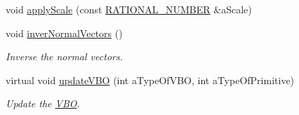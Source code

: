 \begin{DoxyCompactItemize}
void \hyperlink{class_graphics_1_1_triangle_mesh_a939fff82574df1f0150e3f0ddff0757e}{applyScale} (const \hyperlink{namespace_utilities_a40969b96bd8d847b962e297cb79f08ce}{RATIONAL\_\-NUMBER} \&aScale)
\item 
void \hyperlink{class_graphics_1_1_triangle_mesh_a1e104006a495fbabd7c6c8abb38ec3b3}{inverNormalVectors} ()
\begin{DoxyCompactList}\small\item\em Inverse the normal vectors. \end{DoxyCompactList}\item 
virtual void \hyperlink{class_graphics_1_1_triangle_mesh_a94cb51475ab61e9c572eefb2d4cf1de6}{updateVBO} (int aTypeOfVBO, int aTypeOfPrimitive)
\begin{DoxyCompactList}\small\item\em Update the \hyperlink{class_graphics_1_1_v_b_o}{VBO}. \end{DoxyCompactList}\end{DoxyCompactItemize}
